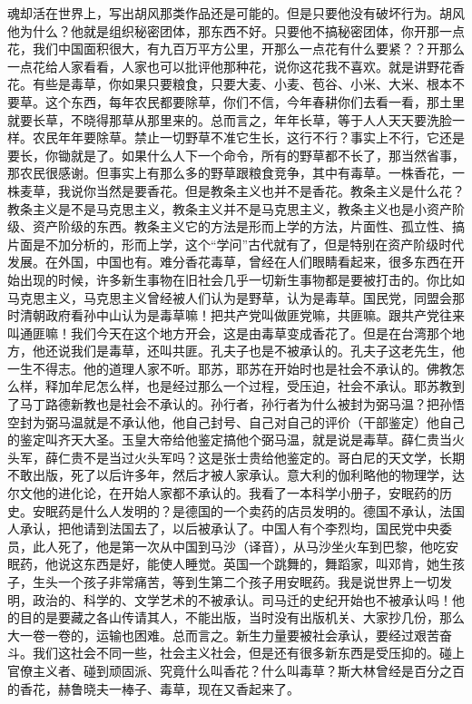 魂却活在世界上，写出胡风那类作品还是可能的。但是只要他没有破坏行为。胡风他为什么？他就是组织秘密团体，那东西不好。只要他不搞秘密团体，你开那一点花，我们中国面积很大，有九百万平方公里，开那么一点花有什么要紧？？开那么一点花给人家看看，人家也可以批评他那种花，说你这花我不喜欢。就是讲野花香花。有些是毒草，你如果只要粮食，只要大麦、小麦、苞谷、小米、大米、根本不要草。这个东西，每年农民都要除草，你们不信，今年春耕你们去看一看，那土里就要长草，不晓得那草从那里来的。总而言之，年年长草，等于人人天天要洗脸一样。农民年年要除草。禁止一切野草不准它生长，这行不行？事实上不行，它还是要长，你锄就是了。如果什么人下一个命令，所有的野草都不长了，那当然省事，那农民很感谢。但事实上有那么多的野草跟粮食竞争，其中有毒草。一株香花，一株麦草，我说你当然是要香花。但是教条主义也并不是香花。教条主义是什么花？教条主义是不是马克思主义，教条主义并不是马克思主义，教条主义也是小资产阶级、资产阶级的东西。教条主义它的方法是形而上学的方法，片面性、孤立性、搞片面是不加分析的，形而上学，这个“学问”古代就有了，但是特别在资产阶级时代发展。在外国，中国也有。难分香花毒草，曾经在人们眼睛看起来，很多东西在开始出现的时候，许多新生事物在旧社会几乎一切新生事物都是要被打击的。你比如马克思主义，马克思主义曾经被人们认为是野草，认为是毒草。国民党，同盟会那时清朝政府看孙中山认为是毒草嘛！把共产党叫做匪党嘛，共匪嘛。跟共产党往来叫通匪嘛！我们今天在这个地方开会，这是由毒草变成香花了。但是在台湾那个地方，他还说我们是毒草，还叫共匪。孔夫子也是不被承认的。孔夫子这老先生，他一生不得志。他的道理人家不听。耶苏，耶苏在开始时也是社会不承认的。佛教怎么样，释加牟尼怎么样，也是经过那么一个过程，受压迫，社会不承认。耶苏教到了马丁路德新教也是社会不承认的。孙行者，孙行者为什么被封为弼马温？把孙悟空封为弼马温就是不承认他，他自己封号、自己对自己的评价（干部鉴定）他自己的鉴定叫齐天大圣。玉皇大帝给他鉴定搞他个弼马温，就是说是毒草。薛仁贵当火头军，薛仁贵不是当过火头军吗？这是张士贵给他鉴定的。哥白尼的天文学，长期不敢出版，死了以后许多年，然后才被人家承认。意大利的伽利略他的物理学，达尔文他的进化论，在开始人家都不承认的。我看了一本科学小册子，安眠药的历史。安眠药是什么人发明的？是德国的一个卖药的店员发明的。德国不承认，法国人承认，把他请到法国去了，以后被承认了。中国人有个李烈均，国民党中央委员，此人死了，他是第一次从中国到马沙（译音），从马沙坐火车到巴黎，他吃安眠药，他说这东西是好，能使人睡觉。英国一个跳舞的，舞蹈家，叫邓肯，她生孩子，生头一个孩子非常痛苦，等到生第二个孩子用安眠药。我是说世界上一切发明，政治的、科学的、文学艺术的不被承认。司马迁的史纪开始也不被承认吗！他的目的是要藏之各山传请其人，不能出版，当时没有出版机关、大家抄几份，那么大一卷一卷的，运输也困难。总而言之。新生力量要被社会承认，要经过艰苦奋斗。我们这社会不同一些，社会主义社会，但是还有很多新东西是受压抑的。碰上官僚主义者、碰到顽固派、究竟什么叫香花？什么叫毒草？斯大林曾经是百分之百的香花，赫鲁晓夫一棒子、毒草，现在又香起来了。

